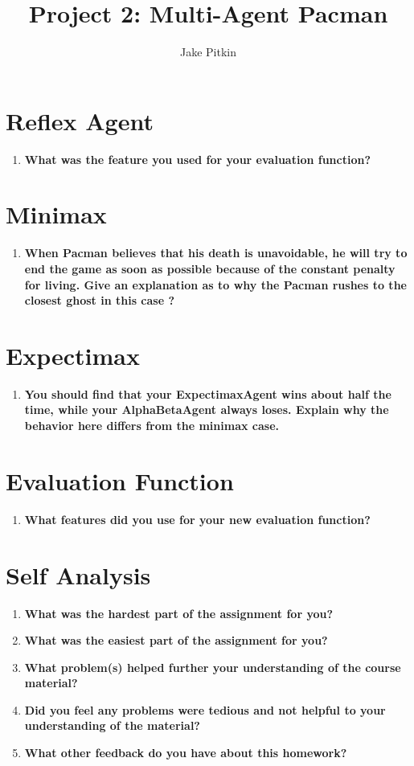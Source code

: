\documentclass[fleqn]{hw}
\title{Project 2: Multi-Agent Pacman}
\institute{University of Utah}
\author{Jake Pitkin}
\begin{document}
\maketitle
\section{Reflex Agent}
\begin{enumerate}
	\item \textbf{What was the feature you used for your evaluation function?}
\end{enumerate}

\section{Minimax}
\begin{enumerate}
	\item \textbf{When Pacman believes that his death is unavoidable, he will try to end the game as
soon as possible because of the constant penalty for living. Give an explanation as to why
the Pacman rushes to the closest ghost in this case ?}
\end{enumerate}

\section{Expectimax}
\begin{enumerate}
	\item \textbf{You should find that your ExpectimaxAgent wins about half the time, while your
AlphaBetaAgent always loses. Explain why the behavior here differs from the minimax case.}
\end{enumerate}

\section{Evaluation Function}
\begin{enumerate}
	\item \textbf{What features did you use for your new evaluation function?}
\end{enumerate}

\section{Self Analysis}

\begin{enumerate}
	\item \textbf{What was the hardest part of the assignment for you?}
	\item \textbf{What was the easiest part of the assignment for you?}
	\item \textbf{What problem(s) helped further your understanding of the course material?}
	\item \textbf{Did you feel any problems were tedious and not helpful to your understanding of the material?}
	\item \textbf{What other feedback do you have about this homework?}
\end{enumerate}
\end{document}
